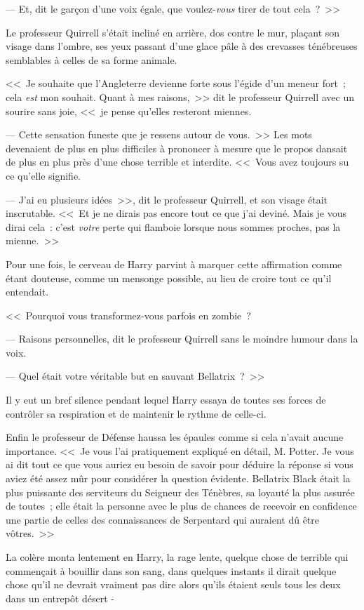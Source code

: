 --- Et, dit le garçon d'une voix égale, que voulez-\emph{vous} tirer de tout cela~?~>>

Le professeur Quirrell s'était incliné en arrière, dos contre le mur, plaçant son visage dans l'ombre, ses yeux passant d'une glace pâle à des crevasses ténébreuses semblables à celles de sa forme animale.

<<~Je souhaite que l'Angleterre devienne forte sous l'égide d'un meneur fort~; cela \emph{est} mon souhait. Quant à mes raisons,~>> dit le professeur Quirrell avec un sourire sans joie, <<~je pense qu'elles resteront miennes.

--- Cette sensation funeste que je ressens autour de vous.~>> Les mots devenaient de plus en plus difficiles à prononcer à mesure que le propos dansait de plus en plus près d'une chose terrible et interdite. <<~Vous avez toujours su ce qu'elle signifie.

--- J'ai eu plusieurs idées~>>, dit le professeur Quirrell, et son visage était inscrutable. <<~Et je ne dirais pas encore tout ce que j'ai deviné. Mais je vous dirai cela~: c'est \emph{votre} perte qui flamboie lorsque nous sommes proches, pas la mienne.~>>

Pour une fois, le cerveau de Harry parvint à marquer cette affirmation comme étant douteuse, comme un mensonge possible, au lieu de croire tout ce qu'il entendait.

<<~Pourquoi vous transformez-vous parfois en zombie~?

--- Raisons personnelles, dit le professeur Quirrell sans le moindre humour dans la voix.

--- Quel était votre véritable but en sauvant Bellatrix~?~>>

Il y eut un bref silence pendant lequel Harry essaya de toutes ses forces de contrôler sa respiration et de maintenir le rythme de celle-ci.

Enfin le professeur de Défense haussa les épaules comme si cela n'avait aucune importance. <<~Je vous l'ai pratiquement expliqué en détail, M. Potter. Je vous ai dit tout ce que vous auriez eu besoin de savoir pour déduire la réponse si vous aviez été assez mûr pour considérer la question évidente. Bellatrix Black était la plus puissante des serviteurs du Seigneur des Ténèbres, sa loyauté la plus assurée de toutes~; elle était la personne avec le plus de chances de recevoir en confidence une partie de celles des connaissances de Serpentard qui auraient dû être vôtres.~>>

La colère monta lentement en Harry, la rage lente, quelque chose de terrible qui commençait à bouillir dans son sang, dans quelques instants il dirait quelque chose qu'il ne devrait vraiment pas dire alors qu'ils étaient seuls tous les deux dans un entrepôt désert -

